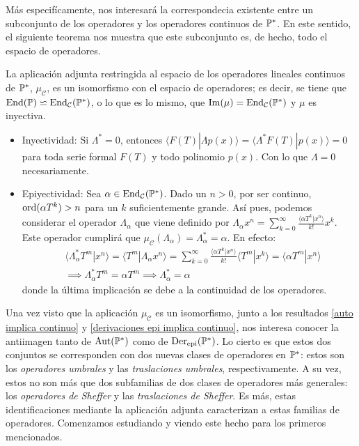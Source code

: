 Más especifícamente, nos interesará la correspondecia existente entre un subconjunto de los operadores y los operadores continuos de $\mathbb{P}^*$. En este sentido, el siguiente teorema nos muestra que este subconjunto es, de hecho, todo el espacio de operadores.

\begin{teorema}
    La aplicación adjunta restringida al espacio de los operadores lineales continuos de $\mathbb{P}^*$, $\mu_{\mathcal{C}}$, es un isomorfismo con el espacio de operadores; es decir, se tiene que $\operatorname*{End}(\mathbb{P}) \backsimeq \operatorname*{End}_{\mathcal{C}}(\mathbb{P}^*)$, o lo que es lo mismo, que $\operatorname{Im}(\mu) = \operatorname*{End}_{\mathcal{C}}(\mathbb{P}^*)$ y $\mu$ es inyectiva.
\end{teorema}
\begin{demo}
    \begin{itemize}
        \item Inyectividad: Si $\Lambda^* = 0$, entonces $\langle F(T)| \Lambda p(x) \rangle = \langle \Lambda^* F(T)| p(x) \rangle = 0$ para toda serie formal $F(T)$ y todo polinomio $p(x)$. Con lo que $\Lambda = 0$ necesariamente.
        \item Epiyectividad: Sea $\alpha \in \operatorname*{End}_{\mathcal{C}}(\mathbb{P}^*)$. Dado un $n > 0$, por ser continuo, $\operatorname*{ord}(\alpha T^k) > n$ para un $k$ suficientemente grande. Así pues, podemos considerar el operador $\Lambda_{\alpha}$ que viene definido por $\displaystyle \Lambda_{\alpha} x^n = \sum_{k=0}^\infty \frac{\langle \alpha T^k | x^n \rangle}{k!}x^k$. Este operador cumplirá que $\mu_{\mathcal{C}}(\Lambda_{\alpha}) = \Lambda_{\alpha}^* = \alpha$. En efecto:
        \begin{align*}
            & \langle \Lambda_{\alpha}^* T^m | x^n \rangle =  \langle T^m | \Lambda_{\alpha}x^n \rangle = \sum_{k=0}^\infty \frac{\langle \alpha T^k | x^n \rangle}{k!}\langle T^m | x^k \rangle = \langle \alpha T^m | x^n \rangle\\
            & \implies \Lambda_{\alpha}^* T^m = \alpha T^m \implies \Lambda_{\alpha}^* = \alpha
        \end{align*}
        donde la última implicación se debe a la continuidad de los operadores. \qedhere
    \end{itemize}
\end{demo}
Una vez visto que la aplicación $\mu_{\mathcal{C}}$ es un isomorfismo, junto a los resultados \ref{auto implica continuo} y \ref{derivaciones epi implica continuo}, nos interesa conocer la antiimagen tanto de $\operatorname*{Aut}(\mathbb{P}^*)$ como de $\operatorname*{Der}_{\mathrm{epi}}(\mathbb{P}^*)$. Lo cierto es que estos dos conjuntos se corresponden con dos nuevas clases de operadores en $\mathbb{P}^*$: estos son los \textit{operadores umbrales} y las \textit{traslaciones umbrales}, respectivamente. A su vez, estos no son más que dos subfamilias de dos clases de operadores más generales: los \textit{operadores de Sheffer} y las \textit{traslaciones de Sheffer}. Es más, estas identificaciones mediante la aplicación adjunta caracterizan a estas familias de operadores. Comenzamos estudiando y viendo este hecho para los primeros mencionados. 

